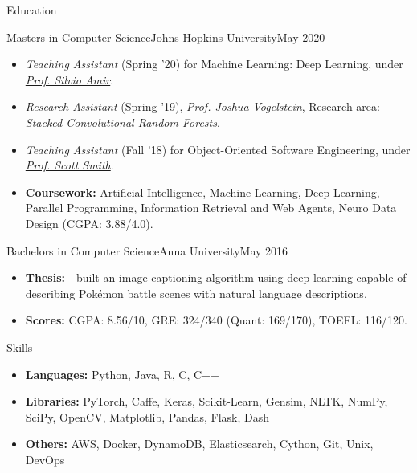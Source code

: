 \documentclass[]{mcdowellcv}
\begin{document}
\begin{cvsection}{Education}
		\begin{cvsubsection}{Masters in Computer Science}{Johns Hopkins University}{May 2020}
			\begin{itemize}
				\item \textit{Teaching Assistant} (Spring '20) for Machine Learning: Deep Learning, under \href{https://samiroid.github.io/}{\color{blue!70}\textit{Prof. Silvio Amir}}.
				\item \textit{Research Assistant} (Spring '19), \href{https://jovo.me/}{\color{blue!70}\textit{Prof. Joshua Vogelstein}}, Research area: \href{https://github.com/tpsatish95/deep-conv-rf}{\color{blue!70}\textit{Stacked Convolutional Random Forests}}.
				\item \textit{Teaching Assistant} (Fall '18) for Object-Oriented Software Engineering, under \href{https://samiroid.github.io/}{\color{blue!70}\textit{Prof. Scott Smith}}.
				\item \textbf{Coursework:} Artificial Intelligence, Machine Learning, Deep Learning, Parallel Programming, Information Retrieval and Web Agents, Neuro Data Design (CGPA: 3.88/4.0).
			\end{itemize}
		\end{cvsubsection}
		\begin{cvsubsection}{Bachelors in Computer Science}{Anna University}{May 2016}
			\begin{itemize}
				\item \textbf{Thesis:} \href{https://github.com/tpsatish95/image-captioning}{} - built an image captioning algorithm using deep learning capable of describing Pokémon battle scenes with natural language descriptions.
				\item \textbf{Scores:} CGPA: 8.56/10, GRE: 324/340 (Quant: 169/170), TOEFL: 116/120.
			\end{itemize}
		\end{cvsubsection}
	\end{cvsection}

    \begin{cvsection}{Skills}
		\begin{cvsubsection}{}{}{}
			\begin{itemize}
				\item \textbf{Languages:} Python, Java, R, C, C++ %
				\item \textbf{Libraries:} PyTorch, Caffe, Keras, Scikit-Learn, Gensim, NLTK, NumPy, SciPy, OpenCV, Matplotlib, Pandas, Flask, Dash
				\item \textbf{Others:} AWS, Docker, DynamoDB, Elasticsearch, Cython, Git, Unix, DevOps
			\end{itemize}
		\end{cvsubsection}
	\end{cvsection}
	
\end{document}
